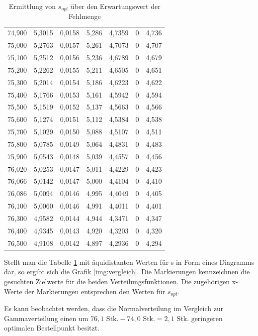 \begin{table}[!h]
\begin{tabular}{|c||c|c|c||c|c|c|}
		74,900 & 5,3015 & 0,0158 & 5,286 & 4,7359 & 0 & 4,736 \\
		75,000 & 5,2763 & 0,0157 & 5,261 & 4,7073 & 0 & 4,707 \\
		75,100 & 5,2512 & 0,0156 & 5,236 & 4,6789 & 0 & 4,679 \\
		75,200 & 5,2262 & 0,0155 & 5,211 & 4,6505 & 0 & 4,651 \\
		75,300 & 5,2014 & 0,0154 & 5,186 & 4,6223 & 0 & 4,622 \\
		75,400 & 5,1766 & 0,0153 & 5,161 & 4,5942 & 0 & 4,594 \\
		75,500 & 5,1519 & 0,0152 & 5,137 & 4,5663 & 0 & 4,566 \\
		75,600 & 5,1274 & 0,0151 & 5,112 & 4,5384 & 0 & 4,538 \\
		75,700 & 5,1029 & 0,0150 & 5,088 & 4,5107 & 0 & 4,511 \\
		75,800 & 5,0785 & 0,0149 & 5,064 & 4,4831 & 0 & 4,483 \\
		75,900 & 5,0543 & 0,0148 & 5,039 & 4,4557 & 0 & 4,456 \\
		76,020 & 5,0253 & 0,0147 & 5,011 & 4,4229 & 0 & 4,423 \\
		\hline
		76,066 & 5,0142 & 0,0147 & \cellcolor[gray]{0.8} 5,000 & 4,4104 & 0 & 4,410 \\
		\hline
		76,086 & 5,0094 & 0,0146 & 4,995 & 4,4049 & 0 & 4,405 \\
		76,100 & 5,0060 & 0,0146 & 4,991 & 4,4011 & 0 & 4,401 \\
		76,300 & 4,9582 & 0,0144 & 4,944 & 4,3471 & 0 & 4,347 \\
		76,400 & 4,9345 & 0,0143 & 4,920 & 4,3203 & 0 & 4,320 \\
		76,500 & 4,9108 & 0,0142 & 4,897 & 4,2936 & 0 & 4,294 \\
		\hline
	\end{tabular}
	\caption{Ermittlung von $s_{opt}$ über den Erwartungswert der Fehlmenge}
	\label{tab:auswertung}
\end{table}
\pagebreak

Stellt man die Tabelle \ref{tab:auswertung} mit äquidistanten Werten für s in Form eines Diagramms dar, so ergibt sich die Grafik \ref{img:vergleich}. Die Markierungen kennzeichnen die gesuchten Zielwerte für die beiden Verteilungsfunktionen. Die zugehörigen x-Werte der Markierungen entsprechen den Werten für \(s_{opt}\).

Es kann beobachtet werden, dass die Normalverteilung im Vergleich zur Gammaverteilung einen um \(76,1\text{ Stk.}-74,0\text{ Stk.}=2,1\text{ Stk.}\) geringeren optimalen Bestellpunkt besitzt.

